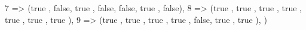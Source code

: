 \documentclass[
  letterpaper,
  DIV=11,
  numbers=noendperiod]{scrreprt}
\newenvironment{Shaded}{\begin{snugshade}}{\end{snugshade}}
\newcommand{\ConstantTok}[1]{\textcolor[rgb]{0.56,0.35,0.01}{#1}}
\newcommand{\FloatTok}[1]{\textcolor[rgb]{0.68,0.00,0.00}{#1}}
\newcommand{\NormalTok}[1]{\textcolor[rgb]{0.00,0.23,0.31}{#1}}
\newcommand{\OperatorTok}[1]{\textcolor[rgb]{0.37,0.37,0.37}{#1}}
\begin{document}
\begin{Shaded}
\begin{Highlighting}[]
    \FloatTok{7}  \OperatorTok{=\textgreater{}}\NormalTok{ (}\ConstantTok{true}\NormalTok{ , }\ConstantTok{false}\NormalTok{, }\ConstantTok{true}\NormalTok{ , }\ConstantTok{false}\NormalTok{, }\ConstantTok{false}\NormalTok{, }\ConstantTok{true}\NormalTok{ , }\ConstantTok{false}\NormalTok{),}
    \FloatTok{8}  \OperatorTok{=\textgreater{}}\NormalTok{ (}\ConstantTok{true}\NormalTok{ , }\ConstantTok{true}\NormalTok{ , }\ConstantTok{true}\NormalTok{ , }\ConstantTok{true}\NormalTok{ , }\ConstantTok{true}\NormalTok{ , }\ConstantTok{true}\NormalTok{ , }\ConstantTok{true}\NormalTok{ ),}
    \FloatTok{9}  \OperatorTok{=\textgreater{}}\NormalTok{ (}\ConstantTok{true}\NormalTok{ , }\ConstantTok{true}\NormalTok{ , }\ConstantTok{true}\NormalTok{ , }\ConstantTok{true}\NormalTok{ , }\ConstantTok{false}\NormalTok{, }\ConstantTok{true}\NormalTok{ , }\ConstantTok{true}\NormalTok{ ),}
\NormalTok{)}


\end{Highlighting}
\end{Shaded}
\end{document}
